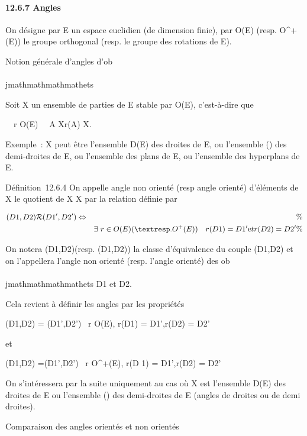 \paragraph{12.6.7 Angles}

On désigne par E un espace euclidien (de dimension finie), par O(E)
(resp. O^+(E)) le groupe orthogonal (resp. le groupe des
rotations de E).

Notion générale d'angles d'ob\\\\jmathmathmathmathets

Soit X un ensemble de parties de E stable par O(E), c'est-à-dire que

\forall~~r \in O(E)\quad
\forall~~A \in X\quad r(A) \in X.

Exemple~: X peut être l'ensemble D(E) des droites de E, ou l'ensemble
\tildeD() des demi-droites de E, ou l'ensemble des
plans de E, ou l'ensemble des hyperplans de E.

Définition~12.6.4 On appelle angle non orienté (resp angle orienté)
d'éléments de X le quotient de X \times X par la relation  définie par

\begin{align*}
(D1,D2)\mathcal{R}(D1',D2')
\Leftrightarrow&& \%& \\
& & \exists~r \in O(E) (\textresp.
O^+(E))\quad r(D 1) =
D1'\text et r(D2) =
D2'\%& \\
\end{align*}

On notera \overline(D1,D2)(resp.
\widehat(D1,D2)) la classe
d'équivalence du couple (D1,D2) et on l'appellera
l'angle non orienté (resp. l'angle orienté) des ob\\\\jmathmathmathmathets D1 et
D2.

Cela revient à définir les angles par les propriétés

\overline(D1,D2) =
\overline(D1',D2')
\Leftrightarrow \exists~r \in O(E),
\quad r(D1) = D1',r(D2) =
D2'

et

\widehat(D1,D2)
=\widehat (D1',D2')
\Leftrightarrow \exists~r \in
O^+(E), \quad r(D 1) =
D1',r(D2) = D2'

On s'intéressera par la suite uniquement au cas où X est l'ensemble D(E)
des droites de E ou l'ensemble \tildeD() des
demi-droites de E (angles de droites ou de demi droites).

Comparaison des angles orientés et non orientés

